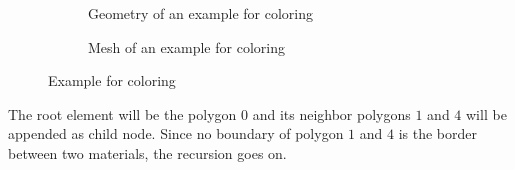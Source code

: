 \begin{figure}[h!]
    \begin{subfigure}[b]{0.5\linewidth}
        \centering
        \caption{Geometry of an example for coloring}
    \end{subfigure}
    \begin{subfigure}[b]{0.5\linewidth}
        \centering
        \caption{Mesh of an example for coloring}
    \end{subfigure}
    \caption{Example for coloring}
    \label{qdt_fig:qdt_color_example}
\end{figure}
The root element will be the polygon $0$ and its neighbor polygons $1$ and $4$ will be appended as child node.
Since no boundary of polygon $1$ and $4$ is the border between two materials, the recursion goes on.
